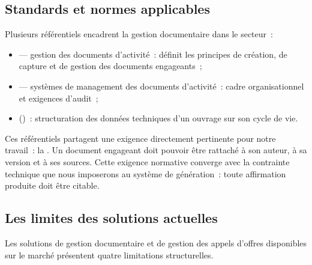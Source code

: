 \subsection{Standards et normes applicables}

Plusieurs référentiels encadrent la gestion documentaire dans le secteur~:

\begin{itemize}
  \item {} — gestion des documents d'activité~: définit les
        principes de création, de capture et de gestion des documents engageants~;
  \item {} — systèmes de management des documents d'activité~:
        cadre organisationnel et exigences d'audit~;
  \item {} ()~: structuration des données techniques d'un
        ouvrage sur son cycle de vie.
\end{itemize}

Ces référentiels partagent une exigence directement pertinente pour notre
travail~: la . Un document engageant doit pouvoir être
rattaché à son auteur, à sa version et à ses sources. Cette exigence normative
converge avec la contrainte technique que nous imposerons au système de
génération~: toute affirmation produite doit être citable.

\subsection{Les limites des solutions actuelles}

Les solutions de gestion documentaire et de gestion des appels d'offres
disponibles sur le marché présentent quatre limitations structurelles.

